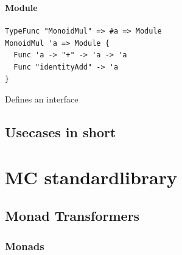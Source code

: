 \begin{frame}[fragile]
   \frametitle{\subsecname}
   \framesubtitle{Module}

   \begin{lstlisting}
TypeFunc "MonoidMul" => #a => Module
MonoidMul 'a => Module {
  Func 'a -> "+" -> 'a -> 'a
  Func "identityAdd" -> 'a
}
   \end{lstlisting}
   Defines an interface
\end{frame}

\subsection{Usecases in short}

\section{MC standardlibrary}
\subsection{Monad Transformers}
\subsubsection{Monads}


